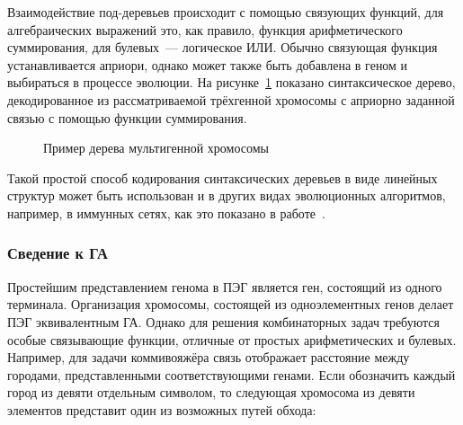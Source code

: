 Взаимодействие под-деревьев происходит с помощью связующих функций, для алгебраических выражений это, как правило, функция арифметического суммирования, для булевых~--- логическое ИЛИ. Обычно связующая функция устанавливается априори, однако может также быть добавлена в геном и выбираться в процессе эволюции. На рисунке~\ref{img:GEP_ET_sample_2} показано синтаксическое дерево, декодированное из рассматриваемой трёхгенной хромосомы с априорно заданной связью с помощью функции суммирования.

\begin{figure} [h]
  \center
  \caption{Пример дерева мультигенной хромосомы}
  \label{img:GEP_ET_sample_2}
\end{figure}

Такой простой способ кодирования синтаксических деревьев в виде линейных структур может быть использован и в других видах эволюционных алгоритмов, например, в иммунных сетях, как это показано в работе~\cite{karakasis2008efficient}.


\subsubsection{Сведение к ГА}

Простейшим представлением генома в ПЭГ является ген, состоящий из одного терминала. Организация хромосомы, состоящей из одноэлементных генов делает ПЭГ эквивалентным ГА. Однако для решения комбинаторных задач требуются особые связывающие функции, отличные от простых арифметических и булевых. Например, для задачи коммивояжёра связь отображает расстояние между городами, представленными соответствующими генами. Если обозначить каждый город из девяти отдельным символом, то следующая хромосома из девяти элементов представит один из возможных путей обхода:

